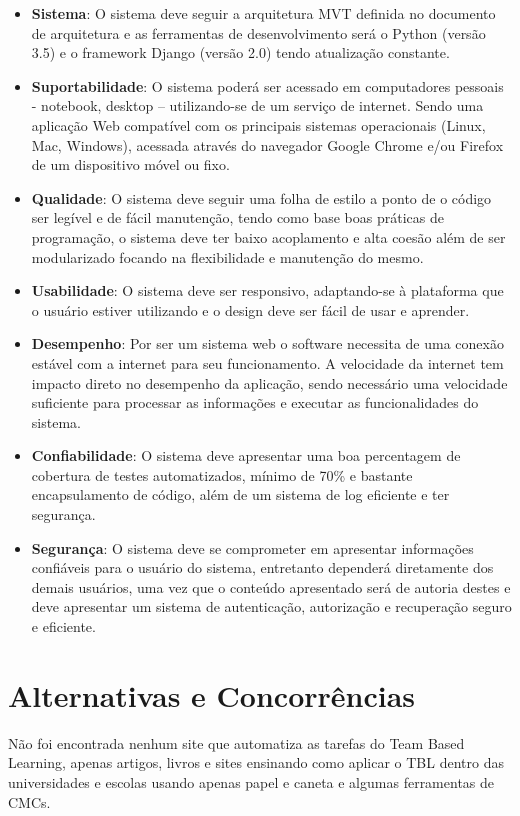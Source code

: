 \begin{itemize}
  \item \textbf{Sistema}: O sistema deve seguir a arquitetura MVT definida no documento de arquitetura e as ferramentas de desenvolvimento será o Python (versão 3.5) e o framework Django (versão 2.0) tendo atualização constante.
  \item \textbf{Suportabilidade}: O sistema poderá ser acessado em computadores pessoais - notebook, desktop – utilizando-se de um serviço de internet. Sendo uma aplicação Web compatível com os principais sistemas operacionais (Linux, Mac, Windows), acessada através do navegador Google Chrome e/ou Firefox de um dispositivo móvel ou fixo.
  \item \textbf{Qualidade}: O sistema deve seguir uma folha de estilo a ponto de o código ser legível e de fácil manutenção, tendo como base boas práticas de programação, o sistema deve ter baixo acoplamento e alta coesão além de ser modularizado focando na flexibilidade e manutenção do mesmo.
  \item \textbf{Usabilidade}: O sistema deve ser responsivo, adaptando-se à plataforma que o usuário estiver utilizando e o design deve ser fácil de usar e aprender.
  \item \textbf{Desempenho}: Por ser um sistema web o software necessita de uma conexão estável com a internet para seu funcionamento. A velocidade da internet tem impacto direto no desempenho da aplicação, sendo necessário uma velocidade suficiente para processar as informações e executar as funcionalidades do sistema.
  \item \textbf{Confiabilidade}: O sistema deve apresentar uma boa percentagem de cobertura de testes automatizados,
    mínimo de 70\% e bastante encapsulamento de código, além de um sistema de log eficiente e ter segurança.
  \item \textbf{Segurança}: O sistema deve se comprometer em apresentar informações confiáveis para o usuário do sistema, entretanto dependerá diretamente dos demais usuários, uma vez que o conteúdo apresentado será de autoria destes e deve apresentar um sistema de autenticação, autorização e recuperação seguro e eficiente.
\end{itemize}

\section{Alternativas e Concorrências}

Não foi encontrada nenhum site que automatiza as tarefas do Team Based Learning, apenas artigos, livros e sites ensinando como aplicar o TBL dentro das universidades e escolas usando apenas papel e caneta e algumas ferramentas de CMCs.

